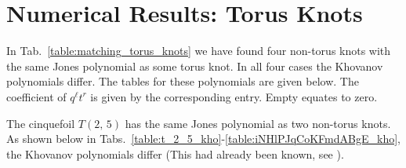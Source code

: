 \documentclass{article}
\theoremstyle{plain}
\begin{document}
    \section{Numerical Results: Torus Knots}
        \begin{table}[H]
            \centering
            \caption{Knots whose Jones polynomial matches that of a Torus Knot}
            \label{table:matching_torus_knots}
        \end{table}
        In Tab.~\ref{table:matching_torus_knots}
        we have found four non-torus knots with the same
        Jones polynomial as some torus knot. In all four cases the Khovanov
        polynomials differ. The tables for these polynomials are given below.
        The coefficient of $q^{\ell}t^{r}$ is given by the corresponding entry.
        Empty equates to zero.
        \par\hfill\par
        The cinquefoil $T(2,\,5)$ has the same Jones polynomial as two
        non-torus knots. As shown below in
        Tabs.~\ref{table:t_2_5_kho}-\ref{table:iNHlPJqCoKFmdABgE_kho}, the
        Khovanov polynomials differ
        (This had already been known, see \cite{KatlasKhoHo}).
\end{document}
